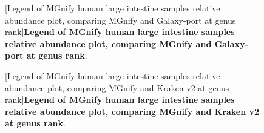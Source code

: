 \begin{figure}[H]
  \centering
  [Legend of MGnify human large intestine samples relative abundance plot, comparing MGnify and Galaxy-port at genus rank]{\textbf{Legend of MGnify human large intestine samples relative abundance plot, comparing MGnify and Galaxy-port at genus rank}.} \label{fig:human_gut_abundance_level_g_mgnifyVSgalaxy_legend.png}%
\end{figure}

\begin{figure}[H]
  \centering
  [Legend of MGnify human large intestine samples relative abundance plot, comparing MGnify and Kraken v2 at genus rank]{\textbf{Legend of MGnify human large intestine samples relative abundance plot, comparing MGnify and Kraken v2 at genus rank}.} \label{fig:human_gut_abundance_level_g_mgnifyVSKraken_legend.png}%
\end{figure}

